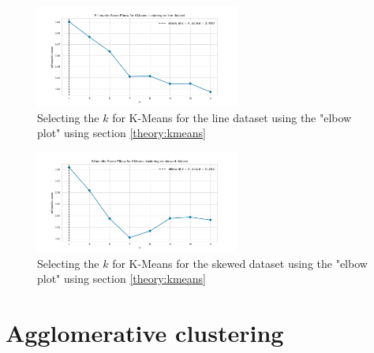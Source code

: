 \begin{figure}[H]
  \includegraphics[width=0.6\textwidth]{Method/images/synthetic-datasets-k/line-dataset_elbow.png}
  \caption{Selecting the $k$ for K-Means for the line dataset using the "elbow plot" using section \ref{theory:kmeans}}
  \label{hyperparameters:k-means-line-dataset}
\end{figure}

\begin{figure}[H]
  \includegraphics[width=0.6\textwidth]{Method/images/synthetic-datasets-k/skewed-dataset_elbow.png}
  \caption{Selecting the $k$ for K-Means for the skewed dataset using the "elbow plot" using section \ref{theory:kmeans}}
  \label{hyperparameters:k-means-skewed-dataset}
\end{figure}

\section{Agglomerative clustering} \label{appendix:agglomerative-hyperparameters}


